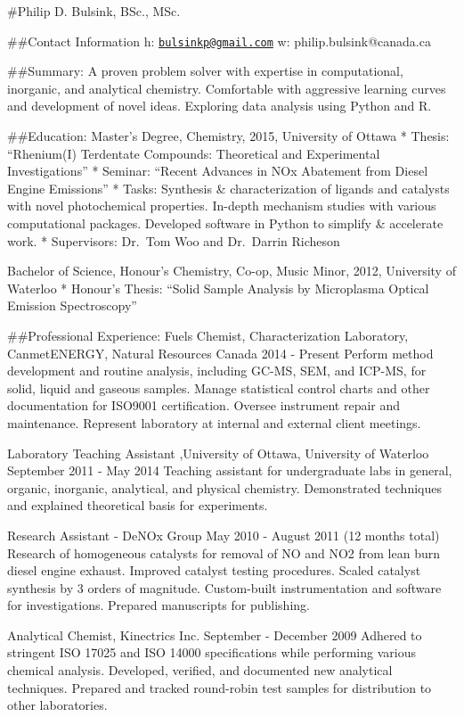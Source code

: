 \documentclass[
]{article}
\date{}
\begin{document}
\#Philip D. Bulsink, BSc., MSc.

\#\#Contact Information h:
\href{mailto:bulsinkp@gmail.com}{\nolinkurl{bulsinkp@gmail.com}} w:
philip.bulsink@canada.ca

\#\#Summary: A proven problem solver with expertise in computational,
inorganic, and analytical chemistry. Comfortable with aggressive
learning curves and development of novel ideas. Exploring data analysis
using Python and R.

\#\#Education: Master's Degree, Chemistry, 2015, University of Ottawa *
Thesis: ``Rhenium(I) Terdentate Compounds: Theoretical and Experimental
Investigations'' * Seminar: ``Recent Advances in NOx Abatement from
Diesel Engine Emissions'' * Tasks: Synthesis \& characterization of
ligands and catalysts with novel photochemical properties. In-depth
mechanism studies with various computational packages. Developed
software in Python to simplify \& accelerate work. * Supervisors:
Dr.~Tom Woo and Dr.~Darrin Richeson

Bachelor of Science, Honour's Chemistry, Co-op, Music Minor, 2012,
University of Waterloo * Honour's Thesis: ``Solid Sample Analysis by
Microplasma Optical Emission Spectroscopy''

\#\#Professional Experience: Fuels Chemist, Characterization Laboratory,
CanmetENERGY, Natural Resources Canada 2014 - Present Perform method
development and routine analysis, including GC-MS, SEM, and ICP-MS, for
solid, liquid and gaseous samples. Manage statistical control charts and
other documentation for ISO9001 certification. Oversee instrument repair
and maintenance. Represent laboratory at internal and external client
meetings.

Laboratory Teaching Assistant ,University of Ottawa, University of
Waterloo September 2011 - May 2014 Teaching assistant for undergraduate
labs in general, organic, inorganic, analytical, and physical chemistry.
Demonstrated techniques and explained theoretical basis for experiments.

Research Assistant - DeNOx Group May 2010 - August 2011 (12 months
total) Research of homogeneous catalysts for removal of NO and NO2 from
lean burn diesel engine exhaust. Improved catalyst testing procedures.
Scaled catalyst synthesis by 3 orders of magnitude. Custom-built
instrumentation and software for investigations. Prepared manuscripts
for publishing.

Analytical Chemist, Kinectrics Inc. September - December 2009 Adhered to
stringent ISO 17025 and ISO 14000 specifications while performing
various chemical analysis. Developed, verified, and documented new
analytical techniques. Prepared and tracked round-robin test samples for
distribution to other laboratories.
\end{document}
